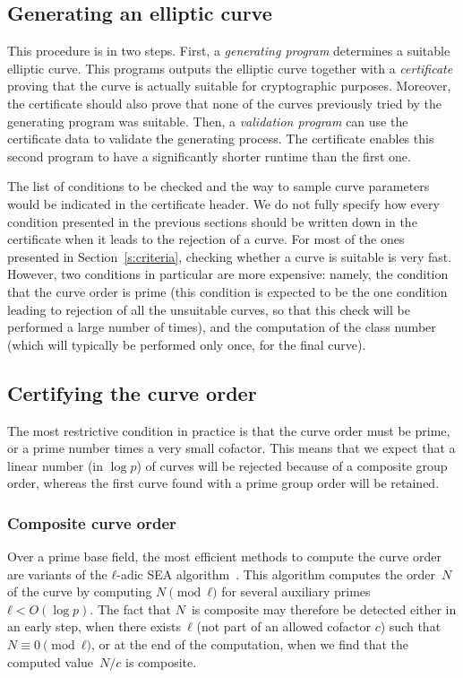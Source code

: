\documentclass[twocolumn,letterpaper]{article}
\begin{document}
\subsection{Generating an elliptic curve}

This procedure is in two steps.
First, a \emph{generating program} determines a suitable elliptic curve.
This programs outputs the elliptic curve
together with a \emph{certificate} proving that
the curve is actually suitable for cryptographic purposes.
Moreover, the certificate should also prove that
none of the curves previously tried by the generating program
was suitable.
Then, a \emph{validation program} can use the certificate data
to validate the generating process.
The certificate enables this second program
to have a significantly shorter runtime than the first one.

The list of conditions to be checked and the way to sample
curve parameters would be indicated in the certificate header.
We do not fully specify how every condition presented
in the previous sections should be written down in the
certificate when it leads to the rejection of a curve.
For most of the ones presented in Section~\ref{s:criteria},
checking whether a curve is suitable is very fast.
However, two conditions in particular are more expensive:
namely, the condition that the curve order is prime
(this condition is expected to be the one condition
leading to rejection of all the unsuitable curves,
so that this check will be performed a large number of times),
and the computation of the class number
(which will typically be performed only once, for the final curve).

\subsection{Certifying the curve order}

The most restrictive condition in practice is that
the curve order must be prime, or a prime number
times a very small cofactor.
This means that we expect that a linear number (in $\log p$)
of curves will be rejected because of a composite group order,
whereas the first curve found with a prime group order
will be retained.

\subsubsection{Composite curve order}

Over a prime base field,
the most efficient methods to compute the curve order are
variants of the $ℓ$-adic SEA algorithm~\cite{mathcomp1985schoof,
jtnb1995schoof,smf2008cl}.
This algorithm computes the order~$N$ of the curve
by computing $N \pmod{ℓ}$ for several
auxiliary primes~$ℓ < O(\log p)$.
The fact that $N$~is composite may therefore be detected
either in an early step,
when there exists~$ℓ$ (not part of an allowed cofactor $c$)
such that $N ≡ 0 \pmod{ℓ}$,
or at the end of the computation,
when we find that the computed value~$N/c$ is composite.
\end{document}
